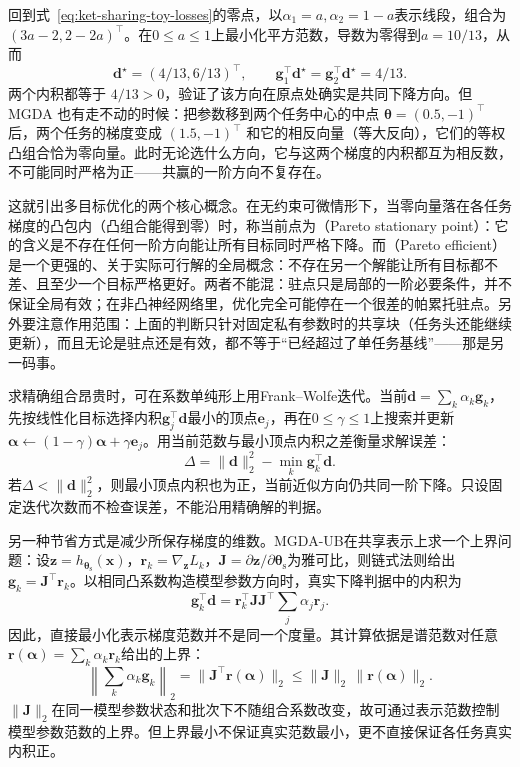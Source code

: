 回到式~\eqref{eq:ket-sharing-toy-losses}的零点，以$\alpha_1=a,\alpha_2=1-a$表示线段，组合为$(3a-2,2-2a)^{\top}$。在$0\leq a\leq1$上最小化平方范数，导数为零得到$a=10/13$，从而
\begin{equation}
  \bm d^\star=(4/13,6/13)^{\top},
  \qquad
  \bm g_1^{\top}\bm d^\star
  =\bm g_2^{\top}\bm d^\star
  =4/13.
  \label{eq:ket-sharing-mgda-numbers}
\end{equation}
两个内积都等于 $4/13>0$，验证了该方向在原点处确实是共同下降方向。但 MGDA 也有走不动的时候：把参数移到两个任务中心的中点 $\bm\theta=(0.5,-1)^\top$ 后，两个任务的梯度变成 $(1.5,-1)^\top$ 和它的相反向量（等大反向），它们的等权凸组合恰为零向量。此时无论选什么方向，它与这两个梯度的内积都互为相反数，不可能同时严格为正——共赢的一阶方向不复存在。

这就引出多目标优化的两个核心概念。在无约束可微情形下，当零向量落在各任务梯度的凸包内（凸组合能得到零）时，称当前点为（Pareto stationary point）：它的含义是不存在任何一阶方向能让所有目标同时严格下降。而（Pareto efficient）是一个更强的、关于实际可行解的全局概念：不存在另一个解能让所有目标都不差、且至少一个目标严格更好。两者不能混：驻点只是局部的一阶必要条件，并不保证全局有效；在非凸神经网络里，优化完全可能停在一个很差的帕累托驻点。另外要注意作用范围：上面的判断只针对固定私有参数时的共享块（任务头还能继续更新），而且无论是驻点还是有效，都不等于“已经超过了单任务基线”——那是另一码事。

求精确组合昂贵时，可在系数单纯形上用Frank--Wolfe迭代。当前$\bm d=\sum_k\alpha_k\bm g_k$，先按线性化目标选择内积$\bm g_j^{\top}\bm d$最小的顶点$\bm e_j$，再在$0\leq\gamma\leq1$上搜索并更新$\bm\alpha\leftarrow(1-\gamma)\bm\alpha+\gamma\bm e_j$。用当前范数与最小顶点内积之差衡量求解误差：
\begin{equation}
  \Delta=\|\bm d\|_2^2-\min_k\bm g_k^{\top}\bm d.
\end{equation}
若$\Delta<\|\bm d\|_2^2$，则最小顶点内积也为正，当前近似方向仍共同一阶下降。只设固定迭代次数而不检查误差，不能沿用精确解的判据。

另一种节省方式是减少所保存梯度的维数。MGDA-UB在共享表示上求一个上界问题：设$\bm z=h_{\bm{\theta}_{\mathrm s}}(\bm x)$，$\bm r_k=\nabla_{\bm z}L_k$，$\bm J=\partial\bm z/\partial\bm{\theta}_{\mathrm s}$为雅可比，则链式法则给出$\bm g_k=\bm J^{\top}\bm r_k$。以相同凸系数构造模型参数方向时，真实下降判据中的内积为
\begin{equation}
  \bm g_k^{\top}\bm d
  =\bm r_k^{\top}\bm J\bm J^{\top}
    \sum_j\alpha_j\bm r_j.
  \label{eq:ket-sharing-mgda-feature-metric}
\end{equation}
因此，直接最小化表示梯度范数并不是同一个度量。其计算依据是谱范数对任意$\bm r(\bm\alpha)=\sum_k\alpha_k\bm r_k$给出的上界：
\[
  \left\|\sum_k\alpha_k\bm g_k\right\|_2
  =\|\bm J^\top\bm r(\bm\alpha)\|_2
  \leq\|\bm J\|_2\,\|\bm r(\bm\alpha)\|_2.
\]
$\|\bm J\|_2$在同一模型参数状态和批次下不随组合系数改变，故可通过表示范数控制模型参数范数的上界。但上界最小不保证真实范数最小，更不直接保证各任务真实内积正。

